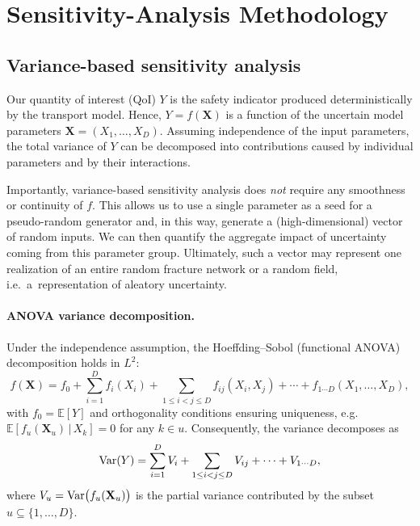 \section{Sensitivity-Analysis Methodology}
\label{sec:sensitivity_methodology}

\subsection{Variance-based sensitivity analysis}
Our quantity of interest (QoI) $Y$ is the safety indicator produced
deterministically by the transport model. Hence, $Y=f(\mathbf{X})$ is a
function of the uncertain model parameters $\mathbf{X}=(X_1,\dots,X_D)$.
Assuming independence of the input parameters, the total variance of $Y$ can be
decomposed into contributions caused by individual parameters and by their
interactions.

Importantly, variance-based sensitivity analysis does \emph{not} require any
smoothness or continuity of $f$. This allows us to use a single parameter as a
seed for a pseudo-random generator and, in this way, generate
a (high-dimensional) vector of random inputs. We can then quantify the
aggregate impact of uncertainty coming from this parameter group. Ultimately,
such a vector may represent one realization of an entire random fracture
network or a random field, i.e.\ a~representation of aleatory uncertainty.

\paragraph{ANOVA variance decomposition.}
Under the independence assumption, the Hoeffding--Sobol (functional ANOVA)
decomposition holds in $L^2$:
\begin{equation}
f(\mathbf{X}) = f_0 + \sum_{i=1}^D f_i(X_i) + \sum_{1\le i<j\le D} f_{ij}(X_i,X_j) + \cdots + f_{1\cdots D}(X_1,\dots,X_D),
\end{equation}
with $f_0=\mathbb{E}[Y]$ and orthogonality conditions ensuring uniqueness, e.g.
$\mathbb{E}[f_u(\mathbf{X}_u)\,|\,X_k]=0$ for any $k\in u$. Consequently, the
variance decomposes as
\begin{equation}
\mathop{\rm Var}(Y) = \sum_{i=1}^D V_i + \sum_{1\le i<j\le D} V_{ij} + \cdots + V_{1\cdots D},
\end{equation}
where $V_u=\mathop{\rm Var}\!\big(f_u(\mathbf{X}_u)\big)$ is the partial variance
contributed by the subset $u\subseteq\{1,\dots,D\}$.

